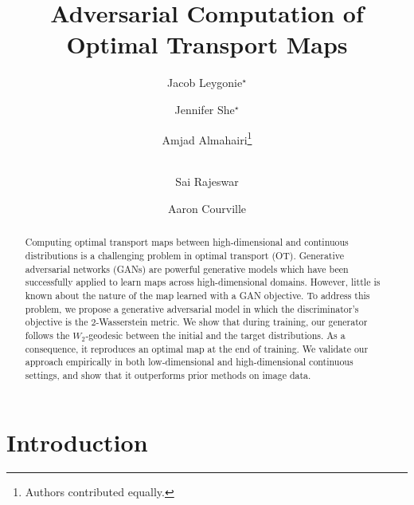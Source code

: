 \documentclass[runningheads]{llncs}
\begin{document}
%
\title{Adversarial Computation of Optimal Transport Maps}
%
%
\author{Jacob Leygonie$^\star$ \and
Jennifer She$^\star$\and
Amjad Almahairi\thanks{Authors contributed equally.} \and \\
Sai Rajeswar \and
Aaron Courville}
%
%
%
\maketitle              %
%
\begin{abstract}
Computing optimal transport maps between high-dimensional and continuous distributions is a challenging problem in optimal transport (OT). Generative adversarial networks (GANs) are powerful generative models which have been successfully applied to learn maps across high-dimensional domains. However, little is known about the nature of the map learned with a GAN objective. To address this problem, we propose a generative adversarial model in which the discriminator's objective is the $2$-Wasserstein metric. We show that during training, our generator follows the $W_2$-geodesic between the initial and the target distributions. As a consequence, it reproduces an optimal map at the end of training. We validate our approach empirically in both low-dimensional and high-dimensional continuous settings, and show that it outperforms prior methods on image data.

\end{abstract}
%
%
%

\section{Introduction}
\label{introduction}

\end{document}
